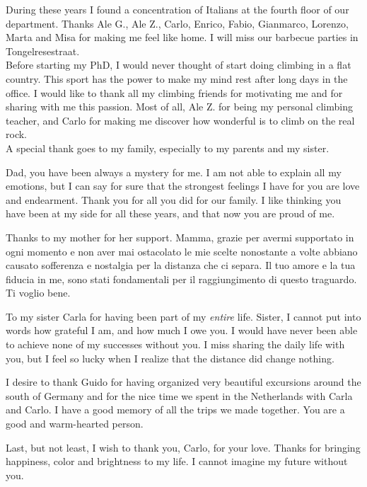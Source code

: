 During these years I found a concentration of Italians at the fourth floor of our department. Thanks Ale G., Ale Z., Carlo, Enrico, Fabio, Gianmarco, Lorenzo, Marta and Misa for making me feel like home. I will miss our barbecue parties in Tongelresestraat.\\

Before starting my PhD, I would never thought of start doing climbing in a flat country. This sport has the power to make my mind rest after long days in the office.
I would like to thank all my climbing friends for motivating me and for sharing with me this passion. Most of all, Ale Z. for being my personal climbing teacher, and Carlo for making me discover how wonderful is to climb on the real rock.\\ 

A special thank goes to my family, especially to my parents and my sister.

Dad, you have been always a mystery for me. I am not able to explain all my emotions, but I can say for sure that the strongest feelings I have for you are love and endearment. Thank you for all you did for our family. I like thinking you have been at my side for all these years, and that now you are proud of me.

Thanks to my mother for her support. Mamma, grazie per avermi supportato in ogni momento e non aver mai ostacolato le mie scelte nonostante a volte abbiano causato sofferenza e nostalgia per la distanza che ci separa. Il tuo amore e la tua fiducia in me, sono stati fondamentali per il raggiungimento di questo traguardo. Ti voglio bene.   

To my sister Carla for having been part of my \textit{entire} life. Sister, I cannot put into words how grateful I am, and how much I owe you. I would have never been able to achieve none of my successes without you.
I miss sharing the daily life with you, but I feel so lucky when I realize that the distance did change nothing. 

I desire to thank Guido for having organized very beautiful excursions around the south of Germany and for the nice time we spent in the Netherlands with Carla and Carlo. I have a good memory of all the trips we made together. You are a good and warm-hearted person.

Last, but not least, I wish to thank you, Carlo, for your love. 
Thanks for bringing happiness, color and brightness to my life. I cannot imagine my future without you.
